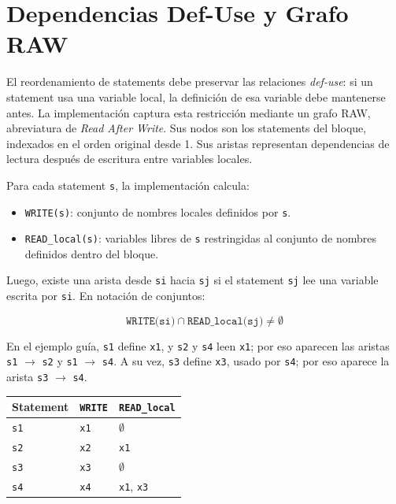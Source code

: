 
\section{Dependencias Def-Use y Grafo RAW}

El reordenamiento de statements debe preservar las relaciones \textit{def-use}: si un statement usa una variable local, la definición de esa variable debe mantenerse antes. La implementación captura esta restricción mediante un grafo RAW, abreviatura de \textit{Read After Write}. Sus nodos son los statements del bloque, indexados en el orden original desde 1. Sus aristas representan dependencias de lectura después de escritura entre variables locales.

Para cada statement \texttt{s}, la implementación calcula:

\begin{itemize}
    \item \texttt{WRITE(s)}: conjunto de nombres locales definidos por \texttt{s}.
    \item \texttt{READ\_local(s)}: variables libres de \texttt{s} restringidas al conjunto de nombres definidos dentro del bloque.
\end{itemize}

Luego, existe una arista desde \texttt{si} hacia \texttt{sj} si el statement \texttt{sj} lee una variable escrita por \texttt{si}. En notación de conjuntos:

\[
\texttt{WRITE(si)} \cap \texttt{READ\_local(sj)} \neq \emptyset
\]

En el ejemplo guía, \texttt{s1} define \texttt{x1}, y \texttt{s2} y \texttt{s4} leen \texttt{x1}; por eso aparecen las aristas \texttt{s1} $\to$ \texttt{s2} y \texttt{s1} $\to$ \texttt{s4}. A su vez, \texttt{s3} define \texttt{x3}, usado por \texttt{s4}; por eso aparece la arista \texttt{s3} $\to$ \texttt{s4}.

\begin{center}
\begin{tabular}{lll}
\hline
Statement & \texttt{WRITE} & \texttt{READ\_local} \\
\hline
\texttt{s1} & \texttt{x1} & $\emptyset$ \\
\texttt{s2} & \texttt{x2} & \texttt{x1} \\
\texttt{s3} & \texttt{x3} & $\emptyset$ \\
\texttt{s4} & \texttt{x4} & \texttt{x1}, \texttt{x3} \\
\hline
\end{tabular}
\end{center}

